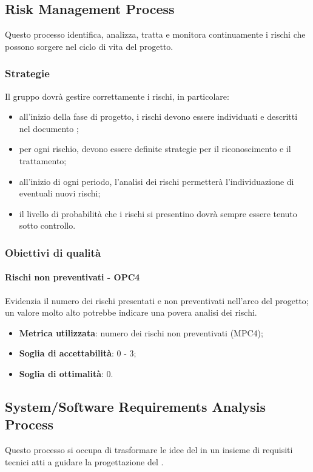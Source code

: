 \documentclass[PdQ.tex]{subfiles}
\begin{document}
	\subsection{Risk Management Process}
		Questo processo identifica, analizza, tratta e monitora continuamente i rischi che possono sorgere nel ciclo di vita del progetto.

		\subsubsection{Strategie}
			Il gruppo dovrà gestire correttamente i rischi, in particolare:
			\begin{itemize}
				\item all'inizio della fase di progetto, i rischi devono essere individuati e descritti nel documento \PPdocRP{};
				\item per ogni rischio, devono essere definite strategie per il riconoscimento e il trattamento;
				\item all'inizio di ogni periodo, l'analisi dei rischi permetterà l'individuazione di eventuali nuovi rischi;
				\item il livello di probabilità che i rischi si presentino dovrà sempre essere tenuto sotto controllo.
			\end{itemize}

		\subsubsection{Obiettivi di qualità}
			\paragraph{Rischi non preventivati - OPC4}
				Evidenzia il numero dei rischi presentati e non preventivati nell'arco del progetto; un valore molto alto potrebbe indicare una povera analisi dei rischi.
				\begin{itemize}
					\item \textbf{Metrica utilizzata}: numero dei rischi non preventivati (MPC4);
					\item \textbf{Soglia di accettabilità}: 0 - 3;
					\item \textbf{Soglia di ottimalità}: 0.
				\end{itemize}

	\subsection{System/Software Requirements Analysis Process}
		Questo processo si occupa di trasformare le idee del  in un insieme di requisiti tecnici atti a guidare la progettazione del .
\end{document}
